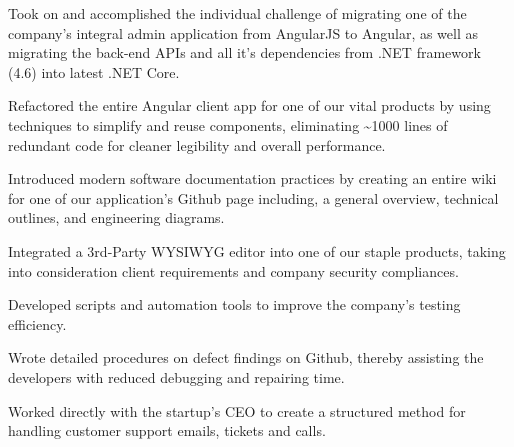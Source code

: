 \documentclass[]{deedy-resume}
\begin{document}
\begin{tightemize}
\item Took on and accomplished the individual challenge of migrating one of the company's integral admin application from AngularJS to Angular, as well as migrating the back-end APIs and all it's dependencies from .NET framework (4.6) into latest .NET Core.
\item Refactored the entire Angular client app for one of our vital products by using techniques to simplify and reuse components, eliminating \textasciitilde1000 lines of redundant code for cleaner legibility and overall performance.
\item Introduced modern software documentation practices by creating an entire wiki for one of our application's Github page including, a general overview, technical outlines, and engineering diagrams.
\item Integrated a 3rd-Party WYSIWYG editor into one of our staple products, taking into consideration client requirements and company security compliances.
\end{tightemize}
\sectionsep

\begin{tightemize}
\item Developed scripts and automation tools to improve the company's testing efficiency.
\item Wrote detailed procedures on defect findings on Github, thereby assisting the developers with reduced debugging and repairing time.
\item Worked directly with the startup's CEO to create a structured method for handling customer support emails, tickets and calls.
\end{tightemize}
\sectionsep
\end{document}
